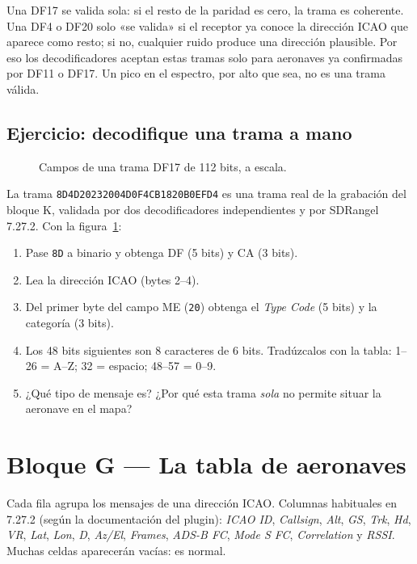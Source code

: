 \begin{importante}
Una DF17 se valida sola: si el resto de la paridad es cero, la trama es coherente. Una DF4 o DF20 solo «se valida» si el receptor ya conoce la dirección ICAO que aparece como resto; si no, cualquier ruido produce una dirección plausible. Por eso los decodificadores aceptan estas tramas solo para aeronaves ya confirmadas por DF11 o DF17. Un pico en el espectro, por alto que sea, no es una trama válida.
\end{importante}

\subsection{Ejercicio: decodifique una trama a mano}

\begin{figure}[H]
\centering
\resizebox{\linewidth}{!}{}
\caption{Campos de una trama DF17 de 112 bits, a escala.}
\label{fig:df17}
\end{figure}

La trama \texttt{8D4D20232004D0F4CB1820B0EFD4} es una trama real de la grabación del bloque K, validada por dos decodificadores independientes y por SDRangel 7.27.2. Con la figura~\ref{fig:df17}:
\begin{enumerate}
  \item Pase \texttt{8D} a binario y obtenga DF (5 bits) y CA (3 bits).
  \item Lea la dirección ICAO (bytes 2--4).
  \item Del primer byte del campo ME (\texttt{20}) obtenga el \emph{Type Code} (5 bits) y la categoría (3 bits).
  \item Los 48 bits siguientes son 8 caracteres de 6 bits. Tradúzcalos con la tabla: 1--26 = A--Z; 32 = espacio; 48--57 = 0--9.
  \item ¿Qué tipo de mensaje es? ¿Por qué esta trama \emph{sola} no permite situar la aeronave en el mapa?
\end{enumerate}

\section{Bloque G --- La tabla de aeronaves}
\label{sec:u-tabla}

Cada fila agrupa los mensajes de una dirección ICAO. Columnas habituales en 7.27.2 (según la documentación del plugin): \emph{ICAO ID}, \emph{Callsign}, \emph{Alt}, \emph{GS}, \emph{Trk}, \emph{Hd}, \emph{VR}, \emph{Lat}, \emph{Lon}, \emph{D}, \emph{Az/El}, \emph{Frames}, \emph{ADS-B FC}, \emph{Mode S FC}, \emph{Correlation} y \emph{RSSI}. Muchas celdas aparecerán vacías: es normal.

